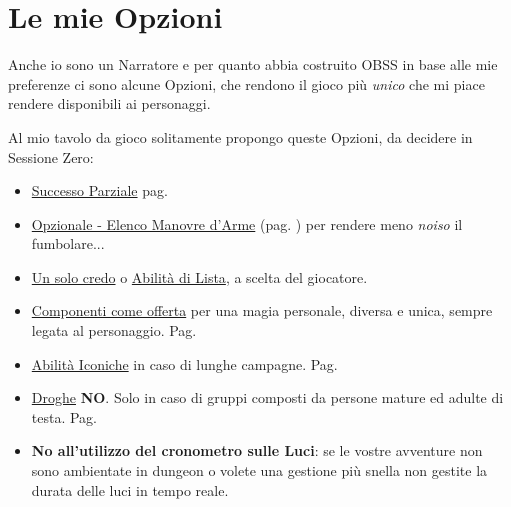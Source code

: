 \section{Le mie Opzioni}

\normalsize

Anche io sono un Narratore e per quanto abbia costruito OBSS in base alle mie preferenze ci sono alcune Opzioni, che rendono il gioco più \emph{unico} che mi piace rendere disponibili ai personaggi.

Al mio tavolo da gioco solitamente propongo queste Opzioni, da decidere in Sessione Zero:

\begin{itemize}[leftmargin=*] \setlength{\itemsep}{0pt}

\item
\hyperlink{successoparziale}{Successo Parziale} pag. \pageref{successoparziale}

\item \hyperlink{elencotalentiarmi}{Opzionale - Elenco Manovre d'Arme} (pag. \pageref{elencotalentiarmi}) per rendere meno \emph{noiso} il fumbolare...


\item
\hyperlink{Un solo credo}{Un solo credo} o \hyperlink{abilitadilista}{Abilità di Lista}, a scelta del giocatore.

\item
\hyperlink{componenticomeofferta}{Componenti come offerta} per una magia personale, diversa e unica, sempre legata al personaggio. Pag. \pageref{componenticomeofferta}

\item
\hyperlink{abilitaiconiche}{Abilità Iconiche} in caso di lunghe campagne. Pag. \pageref{abilitaiconiche}

\item
\hyperlink{droghe}{Droghe} \textbf{NO}. Solo in caso di gruppi composti da persone mature ed adulte di testa. Pag. \pageref{droghe}

\item
\textbf{No all'utilizzo del cronometro sulle Luci}: se le vostre avventure non sono ambientate in dungeon o volete una gestione più snella non gestite la durata delle luci in tempo reale.

\end{itemize}

